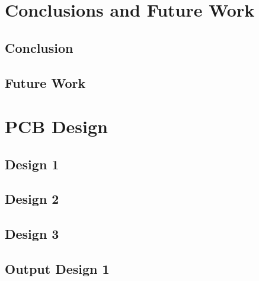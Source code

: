 \documentclass[12pt,openany,a4paper]{book}
\begin{document}









\chapter{Conclusions and Future Work}

\section{Conclusion}


\section{Future Work}







\appendix
{}


\newpage
\chapter{PCB Design}
\section{Design 1}	\label{sec:pcb_design1}

\section{Design 2}	\label{sec:pcb_design2}

\section{Design 3}	\label{sec:pcb_design3}

\section{Output Design 1}	\label{sec:pcb_outdesign1}
\end{document}
